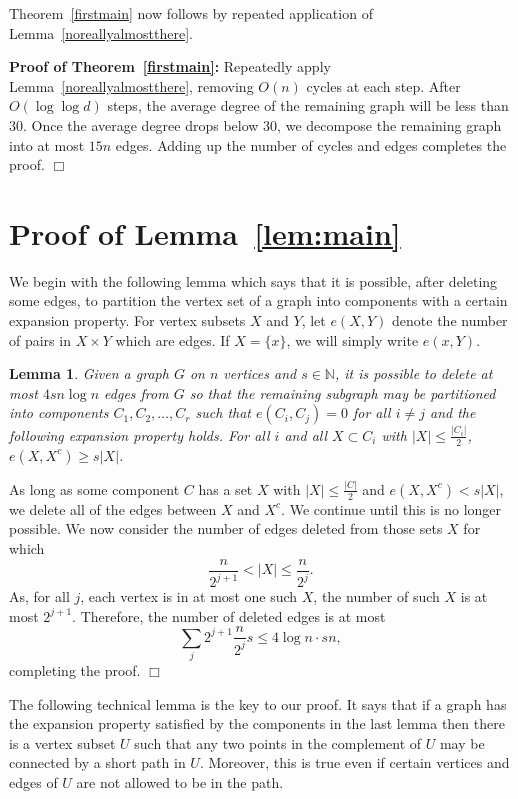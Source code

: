 \documentclass[11pt]{article}
\newtheorem{lemma}[theorem]{Lemma}
\newenvironment{proof}
      {\medskip\noindent{\bf Proof:}\hspace{1mm}}
      {\hfill$\Box$\medskip}
\begin{document}
Theorem~\ref{firstmain} now follows by repeated application of Lemma~\ref{noreallyalmostthere}.

\vspace{2mm}

{\bf Proof of Theorem~\ref{firstmain}:} Repeatedly apply Lemma~\ref{noreallyalmostthere}, removing $O(n)$ cycles at each step. After $O(\log \log d)$ steps, the average degree of the remaining graph will be less than $30$. Once the average degree drops below $30$, we decompose the remaining graph into at most $15 n$ edges. Adding up the number of cycles and edges completes the proof.
{\hfill$\Box$\medskip}

\section{Proof of Lemma~\ref{lem:main}} \label{firstmainlemma}

We begin with the following lemma which says that it is possible, after deleting some edges, to partition the vertex set of a graph into components with a certain expansion property. For vertex subsets $X$ and $Y$, let $e(X,Y)$ denote the number of pairs in $X \times Y$ which are edges. If $X=\{x\}$, we will simply write $e(x,Y)$. 

\begin{lemma} \label{lem:expansion}
Given a graph $G$ on $n$ vertices and $s \in \mathbb{N}$, it is possible to delete at most $4 s n \log n$ edges from $G$ so that the remaining subgraph may be partitioned into components $C_1, C_2, \dots, C_r$ such that $e(C_i, C_j) = 0$ for all $i \neq j$ and the following expansion property holds. For all $i$ and all $X \subset C_i$ with $|X| \leq \frac{|C_i|}{2}$, $e(X, X^c) \geq s |X|$.
\end{lemma}

\begin{proof}
As long as some component $C$ has a set $X$ with $|X| \leq \frac{|C|}{2}$ and $e(X, X^c) < s |X|$, we delete all of the edges between $X$ and $X^c$. We continue until this is no longer possible. We now consider the number of edges deleted from those sets $X$ for which
\[\frac{n}{2^{j+1}} < |X| \leq \frac{n}{2^j}.\]
As, for all $j$, each vertex is in at most one such $X$, the number of such $X$ is at most $2^{j+1}$. Therefore, the number of deleted edges is at most
\[\sum_j 2^{j+1} \frac{n}{2^j} s \leq 4 \log n \cdot s n,\]
completing the proof.
\end{proof}

The following technical lemma is the key to our proof. It says that if a graph has the expansion property satisfied by the components in the last lemma then there is a vertex subset $U$ such that any two points in the complement of $U$ may be connected by a short path in $U$. Moreover, this is true even if certain vertices and edges of $U$ are not allowed to be in the path.
\end{document}
